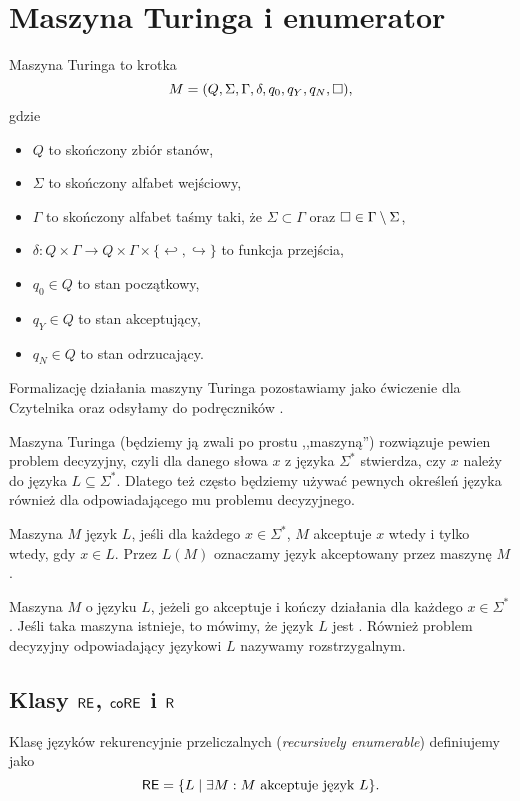 \section{Maszyna Turinga i enumerator}

\begin{definition}
    Maszyna Turinga to krotka
    \[ M = (Q, \Sigma, \Gamma, \delta, q_0, q_Y, q_N, \square),\]
    gdzie
    \begin{itemize}[noitemsep]
        \item $Q$ to skończony zbiór stanów,
        \item $\Sigma$ to skończony alfabet wejściowy,
        \item $\Gamma$ to skończony alfabet taśmy taki, że $\Sigma \subset \Gamma$ oraz $\square \in \Gamma \setminus \Sigma$,
        \item $\delta : Q \times \Gamma \to Q \times \Gamma \times \{\hookleftarrow , \hookrightarrow\}$ to funkcja przejścia,
        \item $q_0 \in Q$ to stan początkowy,
        \item $q_Y \in Q$ to stan akceptujący,
        \item $q_N \in Q$ to stan odrzucający.
    \end{itemize}
    Formalizację działania maszyny Turinga pozostawiamy jako ćwiczenie dla Czytelnika oraz odsyłamy do podręczników \cite{GareyJohnson, Sipser}.
\end{definition}

Maszyna Turinga (będziemy ją zwali po prostu ,,maszyną'') rozwiązuje pewien problem decyzyjny, czyli dla danego słowa $x$ z języka $\Sigma^*$ stwierdza, czy $x$ należy do języka $L \subseteq \Sigma^*$. Dlatego też często będziemy używać pewnych określeń języka również dla odpowiadającego mu problemu decyzyjnego.

Maszyna $M$  język $L$, jeśli dla każdego $x \in \Sigma^*$, $M$ akceptuje $x$ wtedy i tylko wtedy, gdy $x \in L$. Przez $L(M)$ oznaczamy język akceptowany przez maszynę $M$.

Maszyna $M$  o języku $L$, jeżeli go akceptuje i kończy działania dla każdego $x \in \Sigma^*$. Jeśli taka maszyna istnieje, to mówimy, że język $L$ jest . Również problem decyzyjny odpowiadający językowi $L$ nazywamy rozstrzygalnym.

\subsection{Klasy $\textsf{RE}$, $\textsf{coRE}$ i $\textsf{R}$}
\begin{definition}
    Klasę języków rekurencyjnie przeliczalnych (\textit{recursively enumerable}) definiujemy jako
    \[ \textsf{RE} = \{L \mid \exists M : M \text{ akceptuje język } L \}. \]
\end{definition}

